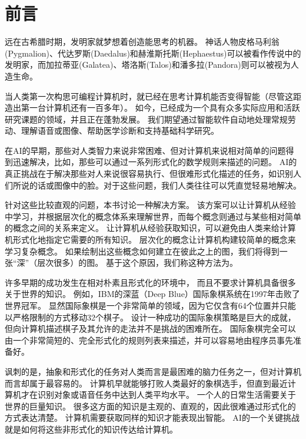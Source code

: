 \chapter{前言}
\label{chap:introduction}
远在古希腊时期，发明家就梦想着创造能思考的机器。
神话人物皮格马利翁(Pygmalion)、代达罗斯(Daedalus)和赫淮斯托斯(Hephaestus)可以被看作传说中的发明家，而加拉蒂亚(Galatea)、塔洛斯(Talos)和潘多拉(Pandora)则可以被视为人造生命\citep{ovid2004metamorphoses,sparkes1996red,1997works}。

当人类第一次构思可编程计算机时，就已经在思考计算机能否变得智能（尽管这距造出第一台计算机还有一百多年）\citep{Lovelace1842}。
如今，已经成为一个具有众多实际应用和活跃研究课题的领域，并且正在蓬勃发展。
我们期望通过智能软件自动地处理常规劳动、理解语音或图像、帮助医学诊断和支持基础科学研究。

在\gls{AI}的早期，那些对人类智力来说非常困难、但对计算机来说相对简单的问题得到迅速解决，比如，那些可以通过一系列形式化的数学规则来描述的问题。
\gls{AI}的真正挑战在于解决那些对人来说很容易执行、但很难形式化描述的任务，如识别人们所说的话或图像中的脸。对于这些问题，我们人类往往可以凭直觉轻易地解决。


针对这些比较直观的问题，本书讨论一种解决方案。
该方案可以让计算机从经验中学习，并根据层次化的概念体系来理解世界，而每个概念则通过与某些相对简单的概念之间的关系来定义。
让计算机从经验获取知识，可以避免由人类来给计算机形式化地指定它需要的所有知识。
层次化的概念让计算机构建较简单的概念来学习复杂概念。
如果绘制出这些概念如何建立在彼此之上的图，我们将得到一张``深''（层次很多）的图。
基于这个原因，我们称这种方法为。


许多早期的成功发生在相对朴素且形式化的环境中， 而且不要求计算机具备很多关于世界的知识。
例如，IBM的深蓝（Deep Blue）国际象棋系统在1997年击败了世界冠军\citep{Hsu2002}。
显然国际象棋是一个非常简单的领域，因为它仅含有64个位置并只能以严格限制的方式移动32个棋子。
设计一种成功的国际象棋策略是巨大的成就，但向计算机描述棋子及其允许的走法并不是挑战的困难所在。
国际象棋完全可以由一个非常简短的、完全形式化的规则列表来描述，并可以容易地由程序员事先准备好。

讽刺的是，抽象和形式化的任务对人类而言是最困难的脑力任务之一，但对计算机而言却属于最容易的。
计算机早就能够打败人类最好的象棋选手，但直到最近计算机才在识别对象或语音任务中达到人类平均水平。
一个人的日常生活需要关于世界的巨量知识。
很多这方面的知识是主观的、直观的，因此很难通过形式化的方式表达清楚。
计算机需要获取同样的知识才能表现出智能。
\gls{AI}的一个关键挑战就是如何将这些非形式化的知识传达给计算机。

